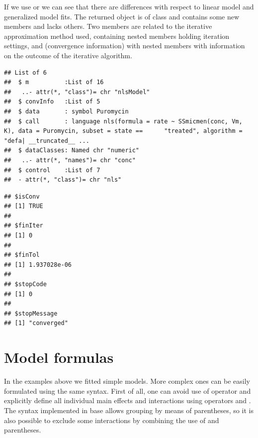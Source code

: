 \documentclass[krantz2]{krantz}\usepackage{knitr}
\begin{document}
\begin{explainbox}
If we use  or  we can see that there are differences with respect to linear model and generalized model fits. The returned object is of class  and contains some new members and lacks others. Two members are related to the iterative approximation method used,  containing nested members holding iteration settings, and  (convergence information) with nested members with information on the outcome of the iterative algorithm.

\begin{knitrout}\footnotesize
{}\color{fgcolor}\begin{kframe}
\begin{alltt}
  \hlstd{=} \hlstd{)}
\end{alltt}
\begin{verbatim}
## List of 6
##  $ m          :List of 16
##   ..- attr(*, "class")= chr "nlsModel"
##  $ convInfo   :List of 5
##  $ data       : symbol Puromycin
##  $ call       : language nls(formula = rate ~ SSmicmen(conc, Vm, K), data = Puromycin, subset = state ==      "treated", algorithm = "defa| __truncated__ ...
##  $ dataClasses: Named chr "numeric"
##   ..- attr(*, "names")= chr "conc"
##  $ control    :List of 7
##  - attr(*, "class")= chr "nls"
\end{verbatim}
\end{kframe}
\end{knitrout}

\begin{knitrout}\footnotesize
{}\color{fgcolor}\begin{kframe}
\begin{alltt}
\hlopt{$}
\end{alltt}
\begin{verbatim}
## $isConv
## [1] TRUE
## 
## $finIter
## [1] 0
## 
## $finTol
## [1] 1.937028e-06
## 
## $stopCode
## [1] 0
## 
## $stopMessage
## [1] "converged"
\end{verbatim}
\end{kframe}
\end{knitrout}
\end{explainbox}


\section{Model formulas}
In the examples above we fitted simple models. More complex ones can be easily formulated using the same syntax. First of all, one can avoid use of operator \code{*} and explicitly define all individual main effects and interactions using operators \code{+} and \code{:}. The syntax implemented in base \Rlang allows grouping by means of parentheses, so it is also possible to exclude some interactions by combining the use of \code{*} and parentheses.
\end{document}
